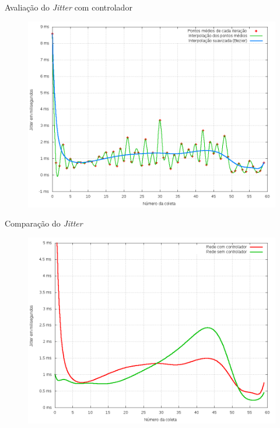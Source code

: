 \begin{frame}{Avaliação do \emph{Jitter} com controlador}

    \begin{figure}[!htb]
        \centering
        \includegraphics[scale=.35]{images/jitter-ctrl}
    \end{figure}
\end{frame}


\begin{frame}{Comparação do \emph{Jitter}}

    \begin{figure}[!htb]
        \centering
        \includegraphics[scale=.35]{images/jitter-stats}
    \end{figure}
\end{frame}


